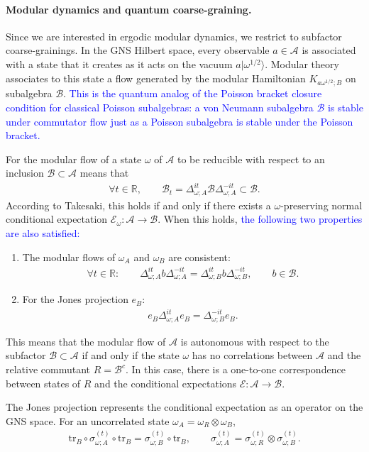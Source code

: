 \documentclass[a4paper,11pt]{article}
\theoremstyle{definition}
\theoremstyle{remark}
\newcommand{\mA}{\mathcal{A}}
\newcommand{\mB}{\mathcal{B}}
\newcommand{\mE}{\mathcal{E}}
\begin{document}
\paragraph{Modular dynamics and quantum coarse-graining.}
Since we are interested in ergodic modular dynamics, we restrict to subfactor
coarse-grainings. In the GNS Hilbert space, every observable $a\in \mA$ is associated
with a state that it creates as it acts on the vacuum $a|\omega^{1/2}\rangle$.  Modular
theory associates to this state a flow generated by the modular Hamiltonian
$K_{a\omega^{1/2};B}$ on subalgebra $\mB$.  \textcolor{blue}{This is the quantum analog of the
Poisson bracket closure condition for classical Poisson subalgebras: a von Neumann
subalgebra $\mB$ is stable under commutator flow just as a Poisson subalgebra is
stable under the Poisson bracket.}
 
For the modular flow of a state $\omega$ of $\mA$ to be reducible with respect to an
inclusion $\mB\subset \mA$ means that
\begin{align}
    \forall t\in\mathbb{R}, \qquad
    \mB_t=\Delta_{\omega;A}^{it}\mB\Delta_{\omega;A}^{-it}\subset \mB.
\end{align}
According to Takesaki, this holds if and only if there exists a $\omega$-preserving
normal conditional expectation $\mE_\omega: \mathcal{A} \to \mB$.  When this holds,
\textcolor{blue}{the following two properties are also satisfied:}
\begin{enumerate}
    \item The modular flows of $\omega_A$ and $\omega_B$ are consistent:
    \begin{align}
    \forall t\in\mathbb{R}:\qquad
    \Delta_{\omega;A}^{it}b\Delta_{\omega;A}^{-it}=\Delta_{\omega;B}^{it}b\Delta_{\omega;B}^{-it},
    \qquad b\in\mB.
    \end{align}
    \item For the Jones projection $e_B$:
    \begin{align}
        e_B\Delta_{\omega;A}^{it}e_B=\Delta_{\omega;B}^{-it}e_B.
    \end{align}
\end{enumerate}
This means that the modular flow of $\mA$ is autonomous with respect to the subfactor
$\mB\subset \mA$ if and only if the state $\omega$ has no correlations between $\mA$
and the relative commutant $R=\mB^c$.  In this case, there is a one-to-one
correspondence between states of $R$ and the conditional expectations $\mE:\mA\to \mB$.
 
The Jones projection represents the conditional expectation as an operator on the GNS
space.  For an uncorrelated state $\omega_A=\omega_R\otimes\omega_B$,
\begin{align}
    \mathrm{tr}_B\circ \sigma_{\omega;A}^{(t)}\circ \mathrm{tr}_B
    =\sigma_{\omega;B}^{(t)}\circ \mathrm{tr}_B, \qquad
    \sigma^{(t)}_{\omega;A}=\sigma^{(t)}_{\omega;R}\otimes \sigma^{(t)}_{\omega;B}.
\end{align}
 
\end{document}
